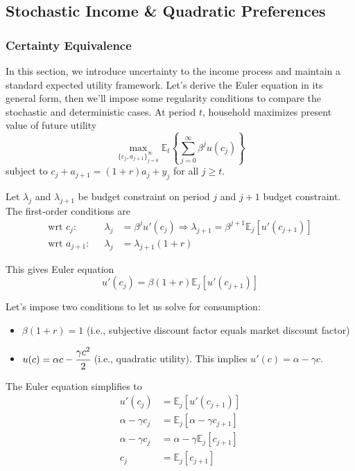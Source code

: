 \documentclass[11pt]{article}
\newcommand{\expectation}{\mathbb{E}}
\begin{document}
\subsection{Stochastic Income \& Quadratic Preferences}
\subsubsection{Certainty Equivalence}
In this section, we introduce uncertainty to the income process and maintain a standard expected utility framework. Let's derive the Euler equation in its general form, then we'll impose some regularity conditions to compare the stochastic and deterministic cases. At period $t$, household maximizes present value of future utility $$\max_{\{c_j, a_{j+1}\}_{j=0}^\infty} \expectation_t \left\{ \sum_{j=0}^\infty \beta^j u(c_j) \right\}$$ subject to $c_j + a_{j+1} = (1+r)a_j + y_j$ for all $j \geq t$. 

Let $\lambda_j$ and $\lambda_{j+1}$ be budget constraint on period $j$ and $j+1$ budget constraint. The first-order conditions are
\begin{align*}
    \text{wrt $c_j$:} && \lambda_j &= \beta^j u'(c_j) \Rightarrow \lambda_{j+1} = \beta^{j+1} \expectation_j[u'(c_{j+1})] \\ 
    \text{wrt $a_{j+1}$:} && \lambda_j &= \lambda_{j+1} (1+r)
\end{align*}

This gives Euler equation $$u'(c_j) = \beta (1+r) \expectation_j[u'(c_{j+1})]$$

Let's impose two conditions to let us solve for consumption:
\begin{itemize}
    \item $\beta(1+r) = 1$ (i.e., subjective discount factor equals market discount factor)
    \item $u(c) = \alpha c - \cfrac{\gamma c^2}{2}$ (i.e., quadratic utility). This implies $u'(c) = \alpha - \gamma c$.
\end{itemize}

The Euler equation simplifies to 
\begin{align*}
    u'(c_j) &= \expectation_j[u'(c_{j+1})] \\
    \alpha - \gamma c_j &= \expectation_j[\alpha - \gamma c_{j+1}] \\
    \alpha - \gamma c_j &= \alpha - \gamma \expectation_j[c_{j+1}] \\
    c_j &= \expectation_j[c_{j+1}]
\end{align*}
\end{document}

